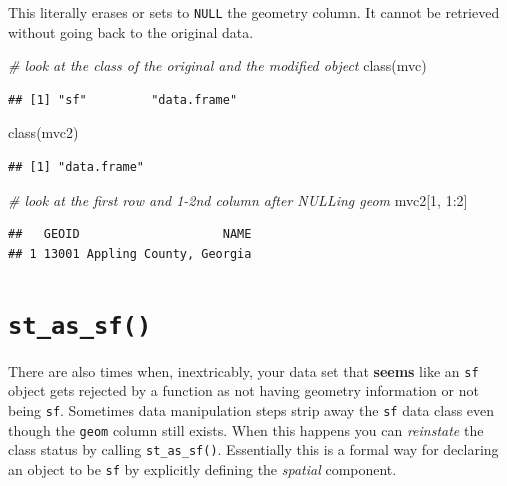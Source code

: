 \documentclass[
]{book}
\newenvironment{Shaded}{\begin{snugshade}}{\end{snugshade}}
\newcommand{\CommentTok}[1]{\textcolor[rgb]{0.56,0.35,0.01}{\textit{#1}}}
\newcommand{\DecValTok}[1]{\textcolor[rgb]{0.00,0.00,0.81}{#1}}
\newcommand{\FunctionTok}[1]{\textcolor[rgb]{0.00,0.00,0.00}{#1}}
\newcommand{\NormalTok}[1]{#1}
\newcommand{\SpecialCharTok}[1]{\textcolor[rgb]{0.00,0.00,0.00}{#1}}
\begin{document}
This literally erases or sets to \texttt{NULL} the geometry column. It cannot be retrieved without going back to the original data.

\begin{Shaded}
\begin{Highlighting}[]
\CommentTok{\# look at the class of the original and the modified object}
\FunctionTok{class}\NormalTok{(mvc)}
\end{Highlighting}
\end{Shaded}

\begin{verbatim}
## [1] "sf"         "data.frame"
\end{verbatim}

\begin{Shaded}
\begin{Highlighting}[]
\FunctionTok{class}\NormalTok{(mvc2)}
\end{Highlighting}
\end{Shaded}

\begin{verbatim}
## [1] "data.frame"
\end{verbatim}

\begin{Shaded}
\begin{Highlighting}[]
\CommentTok{\# look at the first row and 1{-}2nd column after NULLing geom}
\NormalTok{mvc2[}\DecValTok{1}\NormalTok{, }\DecValTok{1}\SpecialCharTok{:}\DecValTok{2}\NormalTok{]}
\end{Highlighting}
\end{Shaded}

\begin{verbatim}
##   GEOID                    NAME
## 1 13001 Appling County, Georgia
\end{verbatim}

\hypertarget{st-as-sf}{%
\section{\texorpdfstring{\texttt{st\_as\_sf()}}{st\_as\_sf()}}\label{st-as-sf}}

There are also times when, inextricably, your data set that \textbf{seems} like an \texttt{sf} object gets rejected by a function as not having geometry information or not being \texttt{sf}. Sometimes data manipulation steps strip away the \texttt{sf} data class even though the \texttt{geom} column still exists. When this happens you can \emph{reinstate} the class status by calling \texttt{st\_as\_sf()}. Essentially this is a formal way for declaring an object to be \texttt{sf} by explicitly defining the \emph{spatial} component.
\end{document}
